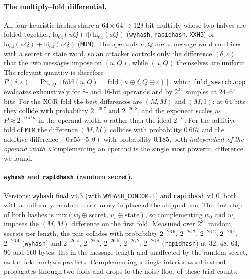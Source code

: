 \paragraph{The multiply--fold differential.}
All four heuristic hashes share a $64\times64\to128$-bit multiply whose two
halves are folded together, $\mathrm{lo}_{64}(uQ)\oplus\mathrm{hi}_{64}(uQ)$
(\texttt{wyhash}, \texttt{rapidhash}, \texttt{XXH3}) or
$\mathrm{lo}_{64}(uQ)+\mathrm{hi}_{64}(uQ)$ (\texttt{MUM}).  The operands
$u,Q$ are a message word combined with a secret or state word, so an attacker
controls only the difference $(\delta,\varepsilon)$ that the two messages impose
on $(u,Q)$, while $(u,Q)$ themselves are uniform.  The relevant quantity is
therefore $P(\delta,\varepsilon)=\Pr_{u,Q}[\mathrm{fold}(u,Q)=
\mathrm{fold}(u\oplus\delta,Q\oplus\varepsilon)]$, which
\texttt{fold\_search.cpp} evaluates exhaustively for $8$- and $16$-bit operands
and by $2^{34}$ samples at $24$--$64$ bits.  For the XOR fold the best
differences are $(M,M)$ and $(M,0)$: at $64$ bits they collide with probability
$2^{-26.7}$ and $2^{-26.8}$, and the exponent scales as $P\approx2^{-0.42n}$ in
the operand width $n$ rather than the ideal $2^{-n}$.  For the additive fold of
\texttt{MUM} the difference $(M,M)$ collides with probability $0.667$ and the
additive difference $(0x55\cdots5,0)$ with probability $0.185$, both
\emph{independent of the operand width}.  Complementing an operand is the single
most powerful difference we found.

\paragraph{\texttt{wyhash} and \texttt{rapidhash} (random secret).}
Versions: \texttt{wyhash} final v4.3 (with \texttt{WYHASH\_\allowbreak CONDOM=1}) and
\texttt{rapidhash} v1.0, both with a uniformly random secret array in place of
the shipped one.  The first step of both hashes is
$\mathrm{mix}(w_0\oplus\mathrm{secret}, w_1\oplus\mathrm{state})$, so
complementing $w_0$ and $w_1$ imposes the $(M,M)$ difference on the first fold.
Measured over $2^{31}$ random secrets per length, the pair collides with
probability $2^{-26.6}$, $2^{-26.7}$, $2^{-26.2}$, $2^{-26.6}$, $2^{-26.4}$
(\texttt{wyhash}) and $2^{-26.4}$, $2^{-26.5}$, $2^{-26.5}$, $2^{-26.2}$,
$2^{-26.8}$ (\texttt{rapidhash}) at $32$, $48$, $64$, $96$ and $160$ bytes: flat
in the message length and unaffected by the random secret, as the
fold analysis predicts.  Complementing a single interior word instead
propagates through two folds and drops to the noise floor of these trial counts.

